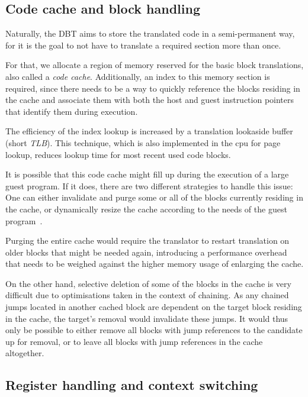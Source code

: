 \subsection{Code cache and block handling}
Naturally, the DBT aims to store the translated code in a semi-permanent way, for it is the goal to not have to translate a required section more than once.

For that, we allocate a region of memory reserved for the basic block translations, also called a \textit{code cache}.
Additionally, an index to this memory section is required, since there needs to be a way to quickly reference the blocks residing in the cache and associate them with both the host and guest instruction pointers that identify them during execution.

The efficiency of the index lookup is increased by a translation lookaside buffer (short \textit{TLB}).
This technique, which is also implemented in the cpu for page lookup, reduces lookup time for most recent used code blocks.

It is possible that this code cache might fill up during the execution of a large guest program.
If it does, there are two different strategies to handle this issue:
One can either invalidate and purge some or all of the blocks currently residing in the cache, or dynamically resize the cache according to the needs of the guest program~\cite[S. 3]{bintrans}.

Purging the entire cache would require the translator to restart translation on older blocks that might be needed again, introducing a performance overhead that needs to be weighed against the higher memory usage of enlarging the cache.

On the other hand, selective deletion of some of the blocks in the cache is very difficult due to optimisations taken in the context of chaining.
As any chained jumps located in another cached block are dependent on the target block residing in the cache, the target's removal would invalidate these jumps.
It would thus only be possible to either remove all blocks with jump references to the candidate up for removal, or to leave all blocks with jump references in the cache altogether.

\subsection{Register handling and context switching}
\label{sec:context-switch-reg-handle}

